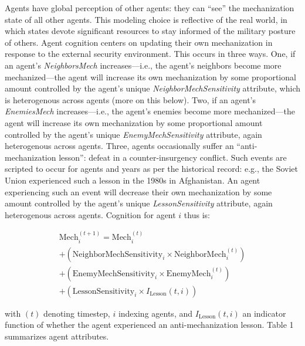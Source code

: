 \documentclass{article}
\begin{document}
Agents have global perception of other agents: they can ``see'' the
mechanization state of all other agents. This modeling choice is reflective of
the real world, in which states devote significant resources to stay informed of
the military posture of others. Agent cognition centers on 
updating their own mechanization in response to the external security
environment. This occurs in three ways. One, if an agent's
\textit{NeighborsMech} increases---i.e., the agent's neighbors become more
mechanized---the agent will increase its own mechanization by some proportional
amount controlled by the agent's unique \textit{NeighborMechSensitivity}
attribute, which is heterogenous across agents (more on this below).
Two, if an agent's
\textit{EnemiesMech} increases---i.e., the agent's enemies become more
mechanized---the agent will increase its own mechanization by some proportional
amount controlled by the agent's unique \textit{EnemyMechSensitivity} attribute,
again heterogenous across agents. Three,
agents occasionally suffer an ``anti-mechanization lesson'': defeat in a
counter-insurgency conflict. Such events are scripted to occur for agents and
years as per the historical record: e.g., the Soviet Union experienced such a
lesson in the 1980s in Afghanistan. An agent experiencing such an event will
decrease their own mechanization by some amount controlled by the agent's
unique \textit{LessonSensitivity} attribute, again heterogenous across agents.
Cognition for agent $i$ thus is:

\begin{multline}
\textrm{Mech}_i^{(t+1)} = \textrm{Mech}_i^{(t)} \\ 
+ (\textrm{NeighborMechSensitivity}_i \times \textrm{NeighborMech}_i^{(t)}) \\
+ (\textrm{EnemyMechSensitivity}_i \times \textrm{EnemyMech}_i^{(t)}) \\
	+ (\textrm{LessonSensitivity}_i \times I_{\textrm{Lesson}}(t, i))
\end{multline}

with $(t)$ denoting timestep, $i$ indexing agents, and $I_{\textrm{Lesson}}(t,
i)$ an indicator function of whether the agent experienced an anti-mechanization
lesson. Table 1 summarizes agent attributes.
\end{document}
